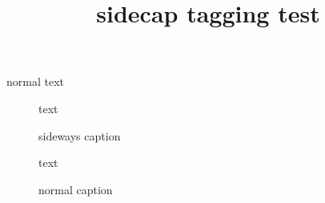 \documentclass{article}
\title{sidecap tagging test}
\begin{document}
normal text

\begin{figure}
text
\caption{sideways caption}
\end{figure}

\begin{figure}
text
\caption{normal caption}
\end{figure}
\end{document}
